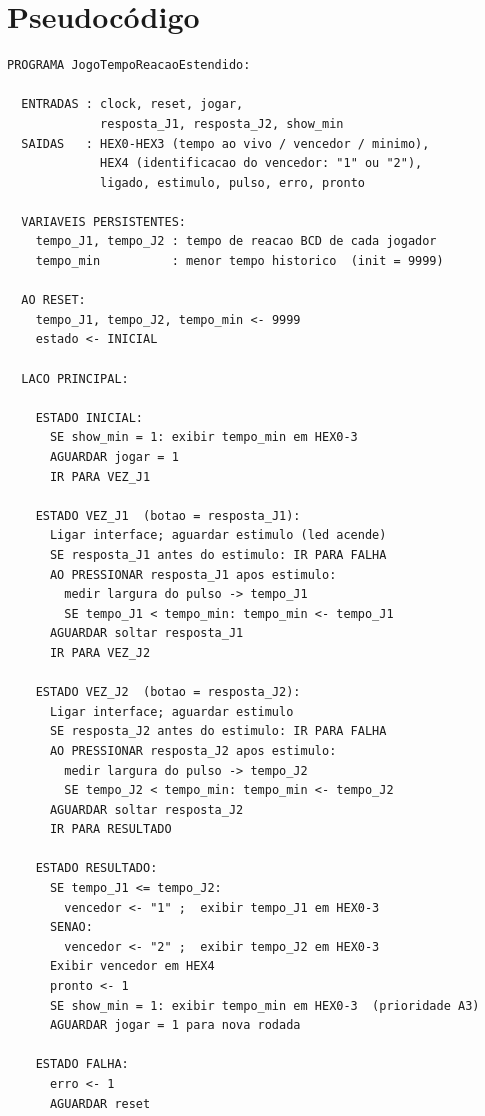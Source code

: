 \documentclass[12pt,a4paper]{article}
\begin{document}
\section{Pseudocódigo}

\begin{verbatim}
PROGRAMA JogoTempoReacaoEstendido:

  ENTRADAS : clock, reset, jogar,
             resposta_J1, resposta_J2, show_min
  SAIDAS   : HEX0-HEX3 (tempo ao vivo / vencedor / minimo),
             HEX4 (identificacao do vencedor: "1" ou "2"),
             ligado, estimulo, pulso, erro, pronto

  VARIAVEIS PERSISTENTES:
    tempo_J1, tempo_J2 : tempo de reacao BCD de cada jogador
    tempo_min          : menor tempo historico  (init = 9999)

  AO RESET:
    tempo_J1, tempo_J2, tempo_min <- 9999
    estado <- INICIAL

  LACO PRINCIPAL:

    ESTADO INICIAL:
      SE show_min = 1: exibir tempo_min em HEX0-3
      AGUARDAR jogar = 1
      IR PARA VEZ_J1

    ESTADO VEZ_J1  (botao = resposta_J1):
      Ligar interface; aguardar estimulo (led acende)
      SE resposta_J1 antes do estimulo: IR PARA FALHA
      AO PRESSIONAR resposta_J1 apos estimulo:
        medir largura do pulso -> tempo_J1
        SE tempo_J1 < tempo_min: tempo_min <- tempo_J1
      AGUARDAR soltar resposta_J1
      IR PARA VEZ_J2

    ESTADO VEZ_J2  (botao = resposta_J2):
      Ligar interface; aguardar estimulo
      SE resposta_J2 antes do estimulo: IR PARA FALHA
      AO PRESSIONAR resposta_J2 apos estimulo:
        medir largura do pulso -> tempo_J2
        SE tempo_J2 < tempo_min: tempo_min <- tempo_J2
      AGUARDAR soltar resposta_J2
      IR PARA RESULTADO

    ESTADO RESULTADO:
      SE tempo_J1 <= tempo_J2:
        vencedor <- "1" ;  exibir tempo_J1 em HEX0-3
      SENAO:
        vencedor <- "2" ;  exibir tempo_J2 em HEX0-3
      Exibir vencedor em HEX4
      pronto <- 1
      SE show_min = 1: exibir tempo_min em HEX0-3  (prioridade A3)
      AGUARDAR jogar = 1 para nova rodada

    ESTADO FALHA:
      erro <- 1
      AGUARDAR reset
\end{verbatim}

\end{document}
